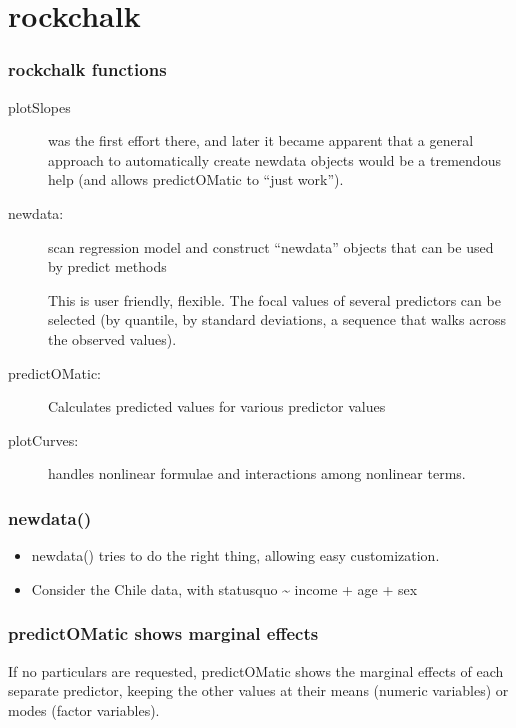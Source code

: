 \documentclass[10pt,english]{beamer}
\def\lyxframeend{} %
\begin{document}
\lyxframeend{}\section{rockchalk}

\begin{frame}
\frametitle{rockchalk functions}
\begin{description}
\item [{plotSlopes}] was the first effort there, and later it became apparent
that a general approach to automatically create newdata objects would
be a tremendous help (and allows predictOMatic to ``just work'').
\item [{newdata:}] scan regression model and construct ``newdata'' objects
that can be used by predict methods


This is user friendly, flexible. The focal values of several predictors
can be selected (by quantile, by standard deviations, a sequence that
walks across the observed values).

\item [{predictOMatic:}] Calculates predicted values for various predictor
values
\item [{plotCurves:}] handles nonlinear formulae and interactions among
nonlinear terms.
\end{description}
\end{frame}

\begin{frame}
\frametitle{newdata()}
\begin{itemize}
\item newdata() tries to do the right thing, allowing easy customization.
\item Consider the Chile data, with statusquo \textasciitilde{} income +
age + sex
\end{itemize}


\end{frame}

\begin{frame}
\frametitle{predictOMatic shows marginal effects}

If no particulars are requested, predictOMatic shows the marginal
effects of each separate predictor, keeping the other values at their
means (numeric variables) or modes (factor variables).





\end{frame}
\end{document}
